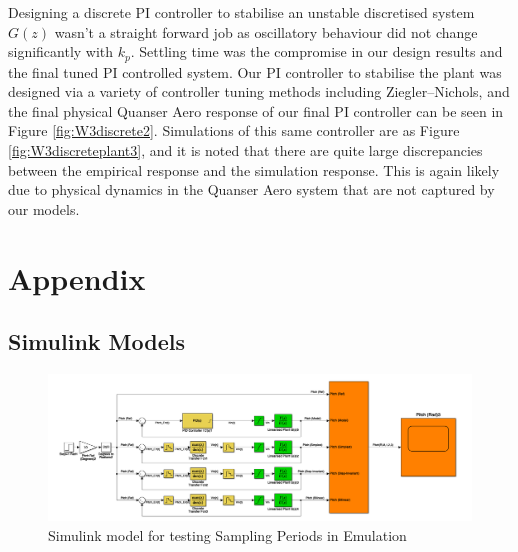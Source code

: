 \documentclass[11pt]{article}
\begin{document}
Designing a discrete PI controller to stabilise an unstable discretised system $G(z)$ wasn't a straight forward job as oscillatory behaviour did not change significantly with $k_p$. Settling time was the compromise in our design results and the final tuned PI controlled system. Our PI controller to stabilise the plant was designed via a variety of controller tuning methods including Ziegler–Nichols, and the final physical Quanser Aero response of our final PI controller can be seen in Figure \ref{fig:W3discrete2}. Simulations of this same controller are as Figure \ref{fig:W3discreteplant3}, and it is noted that there are quite large discrepancies between the empirical response and the simulation response. This is again likely due to physical dynamics in the Quanser Aero system that are not captured by our models.










\newpage
\section{Appendix}
\subsection{Simulink Models}
\begin{figure}[H]
    \centering
    \includegraphics[scale=0.5]{W3_Simulink_Cz.png}
    \caption{Simulink model for testing Sampling Periods in Emulation}
    \label{fig:sims_Cz}
\end{figure}
\end{document}
